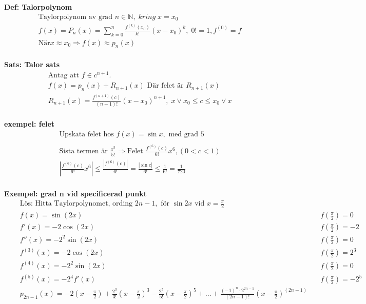 \textbf{Def: Talorpolynom}
\begin{align*}
  &\quad  \text{Taylorpolynom av grad } n \in \mathbb{N}, \; kring \; x=x_0 \\
  &\quad  f(x)=P_n(x)= \displaystyle\sum_{k=0}^{n}\frac{f^{(k)}(x_0)}{k!}{(x-x_0)}^k, \; 0!=1,f^{(0)}=f \\
  &\quad  \text{När} x \approx x_0 \Rightarrow f(x) \approx p_n(x) \\
\end{align*}

\textbf{Sats: Talor sats}
\begin{align*}
  &\quad  \text{Antag att $f\in c^{n+1}$.} \\
  &\quad  f(x)=p_n(x)+R_{n+1}(x) \text{ Där felet är } R_{n+1}(x) \\
  &\quad  R_{n+1}(x)=\frac{f^{(n+1)}(c)}{(n+1)!}{(x-x_0)}^{n+1}, \; x \lor x_0 \leq c \leq x_0 \lor x \\
\end{align*}

\textbf{exempel: felet}
\begin{align*}
  &\quad  \text{Upskata felet hos } f(x)=\sin{x}, \text{ med grad } 5 \\
  &\quad  \\
  &\quad  \text{Sista termen är } \frac{x^5}{5!} \Rightarrow \text{Felet } \frac{f^{(6)}(c)}{6!}x^6, (0<c<1) \\
  &\quad  |\frac{f^{(6)}(c)}{6!}x^6| \leq \frac{|f^{(6)}(c)|}{6!} = \frac{|\sin{c}|}{6!}
  \leq \frac{1}{6!} = \frac{1}{720} \\
\end{align*}


\textbf{Exempel: grad n vid specificerad punkt}
\begin{align*}
  &\quad  \text{Lös: Hitta Taylorpolynomet, ording } 2n-1, \text{ för } \sin{2x} \text{ vid } x=\frac{\pi}{2} \\
  &\quad  f(x)=\sin(2x)          &\quad f(\frac{\pi}{2})=0   \\
  &\quad  f'(x)=-2\cos(2x)       &\quad f(\frac{\pi}{2})=-2  \\
  &\quad  f''(x)=-2^2\sin(2x)    &\quad f(\frac{\pi}{2})=0   \\
  &\quad  f^{(3)}(x)=-2\cos(2x)   &\quad f(\frac{\pi}{2})=2^3 \\
  &\quad  f^{(4)}(x)=-2^2\sin(2x) &\quad f(\frac{\pi}{2})=0   \\
  &\quad  f^{(5)}(x)=-2^4f'(x)    &\quad f(\frac{\pi}{2})=-2^5 \\
  &\quad  p_{2n-1}(x)=-2(x-\frac{\pi}{2}) + \frac{2^3}{3!}{(x-\frac{\pi}{2})}^3 -
  \frac{2^5}{5!}{(x-\frac{\pi}{2})}^5+\ldots+\frac{{(-1)}^n\cdot2^{2n-1}}{(2n-1)!}{(x-\frac{\pi}{2})}^{(2n-1)} \\
\end{align*}


